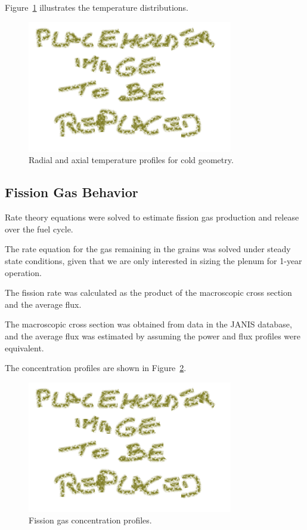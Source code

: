 Figure~\ref{fig:temperature_profile} illustrates the temperature distributions.

\begin{figure}[H]
\centering
\includegraphics[width=0.8\textwidth]{placeholder.png}
\caption{Radial and axial temperature profiles for cold geometry.}
\label{fig:temperature_profile}
\end{figure}

\subsection{Fission Gas Behavior}
Rate theory equations were solved to estimate fission gas production and release over the fuel cycle.

The rate equation for the gas remaining in the grains was solved under steady state conditions, given that we are only interested in sizing the plenum for 1-year operation.

The fission rate was calculated as the product of the macroscopic cross section and the average flux.

The macroscopic cross section was obtained from data in the JANIS database, and the average flux was estimated by assuming the power and flux profiles were equivalent.

The concentration profiles are shown in Figure~\ref{fig:fission_gas}.

\begin{figure}[H]
\centering
\includegraphics[width=0.8\textwidth]{placeholder.png}
\caption{Fission gas concentration profiles.}
\label{fig:fission_gas}
\end{figure}
